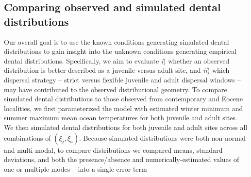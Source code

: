 \documentclass[]{rsos}%
\begin{document}
\subsection{Comparing observed and simulated dental distributions}

Our overall goal is to use the known conditions generating simulated dental distributions to gain insight into the unknown conditions generating empirical dental distributions.
Specifically, we aim to evaluate \emph{i}) whether an observed distribution is better described as a juvenile versus adult site, and \emph{ii}) which dispersal strategy -- strict versus flexible juvenile and adult dispersal windows -- may have contributed to the observed distributional geometry. 
To compare simulated dental distributions to those observed from contemporary and Eocene localities, we first parameterized the model with estimated winter minimum and summer maximum mean ocean temperatures for both juvenile and adult sites.
We then simulated dental distributions for both juvenile and adult sites across all combinations of $(\xi_j,\xi_a)$.
Because simulated distributions were both non-normal and multi-modal, to compare distributions we compared means, standard deviations, and both the presence/absence and numerically-estimated values of one or multiple modes -- into a single error term
\end{document}
